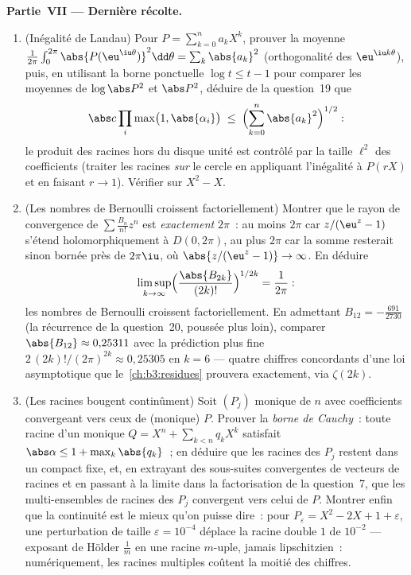 \begin{problem}
\medskip
\noindent\textbf{Partie~VII --- Dernière récolte.}
\begin{enumerate}[resume]
  \item (Inégalité de Landau) Pour $P = \sum_{k=0}^na_kX^k$,
        prouver la moyenne $\frac1{2\pi}\int_0^{2\pi}
        \abs{P(\eu^{\iu\theta})}^2\dd\theta =
        \sum_k\abs{a_k}^2$ (orthogonalité des
        $\eu^{\iu k\theta}$), puis, en utilisant la borne
        ponctuelle $\log t \leq t - 1$ pour comparer les
        moyennes de $\log\abs P^2$ et $\abs P^2$, déduire de
        la question~19 que
        \[
        \abs c\prod_{i}\max\bigl(1, \abs{\alpha_i}\bigr)
        \;\leq\;
        \Bigl(\sum_{k=0}^{n}\abs{a_k}^2\Bigr)^{1/2} :
        \]
        le produit des racines hors du disque unité est
        contrôlé par la taille $\ell^2$ des coefficients
        (traiter les racines \emph{sur} le cercle en
        appliquant l'inégalité à $P(rX)$ et en faisant $r \to
        1$). Vérifier sur $X^2 - X$.
  \item (Les nombres de Bernoulli croissent
        factoriellement) Montrer que le rayon de convergence
        de $\sum\frac{B_n}{n!}z^n$ est \emph{exactement}
        $2\pi$~: au moins $2\pi$ car $z/(\eu^z - 1)$ s'étend
        holomorphiquement à $D(0, 2\pi)$, au plus $2\pi$ car
        la somme resterait sinon bornée près de $2\pi\iu$, où
        $\abs{z/(\eu^z-1)} \to \infty$. En déduire
        \[
        \limsup_{k\to\infty}
        \Bigl(\frac{\abs{B_{2k}}}{(2k)!}\Bigr)^{1/2k}
        = \frac1{2\pi} :
        \]
        les nombres de Bernoulli croissent factoriellement.
        En admettant $B_{12} = -\frac{691}{2730}$ (la
        récurrence de la question~20, poussée plus loin),
        comparer $\abs{B_{12}} \approx 0{,}25311$ avec la
        prédiction plus fine $2\,(2k)!/(2\pi)^{2k} \approx
        0{,}25305$ en $k = 6$ --- quatre chiffres
        concordants d'une loi asymptotique
        que le~\cref{ch:b3:residues} prouvera exactement, via
        $\zeta(2k)$.
  \item (Les racines bougent continûment) Soit $(P_j)$ monique
        de  $n$ avec coefficients convergeant vers ceux
        de (monique) $P$. Prouver la \emph{borne de Cauchy}~:
        toute racine d'un monique $Q = X^n +
        \sum_{k<n}q_kX^k$ satisfait $\abs\alpha \leq 1 +
        \max_k\abs{q_k}$~; en déduire que les racines des
        $P_j$ restent dans un compact fixe, et, en extrayant
        des sous-suites convergentes de vecteurs de racines
        et en passant à la limite dans la factorisation de
        la question~7, que les multi-ensembles de racines
        des $P_j$ convergent vers celui de $P$. Montrer enfin
        que la continuité est le mieux qu'on puisse dire~:
        pour $P_\varepsilon = X^2 - 2X + 1 + \varepsilon$,
        une perturbation de taille $\varepsilon = 10^{-4}$
        déplace la racine double $1$ de $10^{-2}$ ---
        exposant de Hölder $\frac1m$ en une racine $m$-uple,
        jamais lipschitzien~: numériquement, les racines
        multiples coûtent la moitié des chiffres.
\end{enumerate}
\end{problem}
